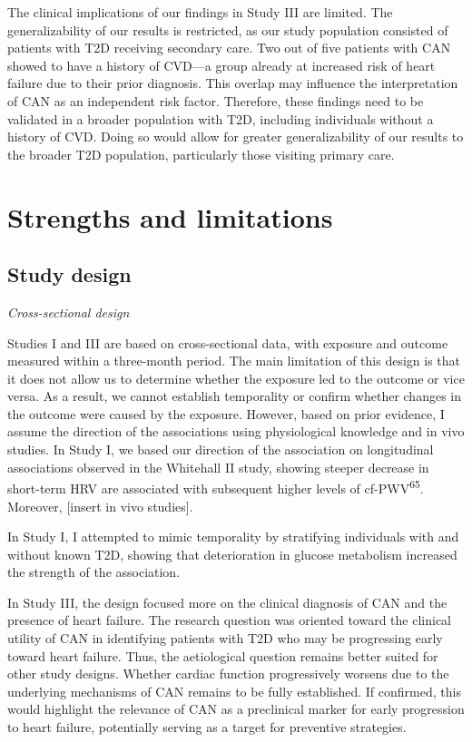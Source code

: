 \documentclass[
  a4paper,
  headsepline=true,
  open=any]{scrbook}
\begin{document}
The clinical implications of our findings in Study III are limited. The
generalizability of our results is restricted, as our study population
consisted of patients with T2D receiving secondary care. Two out of five
patients with CAN showed to have a history of CVD---a group already at
increased risk of heart failure due to their prior diagnosis. This
overlap may influence the interpretation of CAN as an independent risk
factor. Therefore, these findings need to be validated in a broader
population with T2D, including individuals without a history of CVD.
Doing so would allow for greater generalizability of our results to the
broader T2D population, particularly those visiting primary care.

\hypertarget{strengths-and-limitations}{%
\section{Strengths and limitations}\label{strengths-and-limitations}}

\hypertarget{study-design}{%
\subsection{Study design}\label{study-design}}

\emph{Cross-sectional design}

Studies I and III are based on cross-sectional data, with exposure and
outcome measured within a three-month period. The main limitation of
this design is that it does not allow us to determine whether the
exposure led to the outcome or vice versa. As a result, we cannot
establish temporality or confirm whether changes in the outcome were
caused by the exposure. However, based on prior evidence, I assume the
direction of the associations using physiological knowledge and in vivo
studies. In Study I, we based our direction of the association on
longitudinal associations observed in the Whitehall II study, showing
steeper decrease in short-term HRV are associated with subsequent higher
levels of cf-PWV\textsuperscript{65}. Moreover, {[}insert in vivo
studies{]}.

In Study I, I attempted to mimic temporality by stratifying individuals
with and without known T2D, showing that deterioration in glucose
metabolism increased the strength of the association.

In Study III, the design focused more on the clinical diagnosis of CAN
and the presence of heart failure. The research question was oriented
toward the clinical utility of CAN in identifying patients with T2D who
may be progressing early toward heart failure. Thus, the aetiological
question remains better suited for other study designs. Whether cardiac
function progressively worsens due to the underlying mechanisms of CAN
remains to be fully established. If confirmed, this would highlight the
relevance of CAN as a preclinical marker for early progression to heart
failure, potentially serving as a target for preventive strategies.
\end{document}

